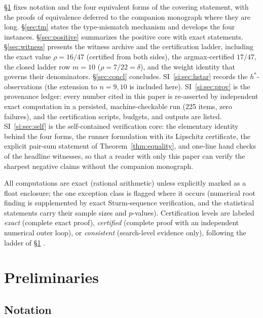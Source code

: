 \documentclass[11pt,a4paper]{article}
\numberwithin{equation}{section}
\theoremstyle{plain}
\theoremstyle{definition}
\theoremstyle{remark}
\begin{document}
\S\ref{sec:prelim} fixes notation and the four equivalent forms of the
covering statement, with the proofs of equivalence deferred to the
companion monograph where they are long. \S\ref{sec:tm} states the
type-mismatch mechanism and develops the four instances.
\S\ref{sec:positive} summarizes the positive core with exact statements.
\S\ref{sec:witness} presents the witness archive and the certification
ladder, including the exact value $\rho=16/47$ (certified from both
sides), the argmax-certified $17/47$, the closed ladder row $m=10$
($\rho=7/22=\delta$), and
the weight identity that governs their denominators.
\S\ref{sec:concl} concludes. SI~\ref{si:sec:hstar} records the
$h^*$-observations (the extension to $n=9,10$ is included here).
SI~\ref{si:sec:prov} is the provenance ledger: every number cited in
this paper is re-asserted by independent exact computation in a
persisted, machine-checkable run (225 items, zero failures), and the
certification scripts, budgets, and outputs are listed.
SI~\ref{si:sec:self} is the self-contained verification core: the
elementary identity behind the four forms, the runner formulation with
its Lipschitz certificate, the explicit pair-sum statement of
Theorem~\ref{thm:equality}, and one-line hand checks of the headline
witnesses, so that a reader with only this paper can verify the sharpest
negative claims without the companion monograph.

All computations are exact (rational arithmetic) unless explicitly marked
as a float enclosure; the one exception class is flagged where it occurs
(numerical root finding is supplemented by exact Sturm-sequence
verification, and the statistical statements carry their sample sizes and
$p$-values). Certification levels are labeled \emph{exact}
(complete exact proof), \emph{certified} (complete proof with an
independent numerical outer loop), or \emph{consistent} (search-level
evidence only), following the ladder of \S\ref{sec:prelim}
\cite{prog-artifacts}.


\section{Preliminaries}\label{sec:prelim}

\subsection{Notation}
\end{document}
